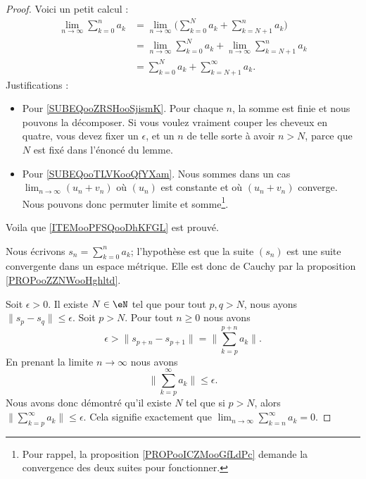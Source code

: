 \begin{proof}
    Voici un petit calcul :
    \begin{subequations}
        \begin{align}
            \lim_{n\to \infty} \sum_{k=0}^na_k&=\lim_{n\to \infty} \big( \sum_{k=0}^Na_k+\sum_{k=N+1}^{n}a_k \big)      \label{SUBEQooZRSHooSjismK}\\
            &=\lim_{n\to \infty} \sum_{k=0}^{N}a_k+\lim_{n\to \infty} \sum_{k=N+1}^{n}a_k       \label{SUBEQooTLVKooQfYXam}\\
            &=\sum_{k=0}^Na_k+\sum_{k=N+1}^{\infty}a_k.
        \end{align}
    \end{subequations}
    Justifications :
    \begin{itemize}
        \item Pour \eqref{SUBEQooZRSHooSjismK}. Pour chaque \( n\), la somme est finie et nous pouvons la décomposer. Si vous voulez vraiment couper les cheveux en quatre, vous devez fixer un \( \epsilon\), et un \( n\) de telle sorte à avoir \( n>N\), parce que \( N\) est fixé dans l'énoncé du lemme.
        \item Pour \eqref{SUBEQooTLVKooQfYXam}. Nous sommes dans un cas \( \lim_{n\to \infty}(u_n+v_n) \) où \( (u_n)\) est constante et où \( (u_n+v_n)\) converge. Nous pouvons donc permuter limite et somme\footnote{Pour rappel, la proposition \ref{PROPooICZMooGfLdPc} demande la convergence des deux suites pour fonctionner.}.
    \end{itemize}
    Voila que \ref{ITEMooPFSQooDhKFGL} est prouvé.

    Nous écrivons \( s_n=\sum_{k=0}^na_k\); l'hypothèse est que la suite \( (s_n)\) est une suite convergente dans un espace métrique. Elle est donc de Cauchy par la proposition \ref{PROPooZZNWooHghltd}.

    Soit \( \epsilon>0\). Il existe \( N\in \eN\) tel que pour tout \( p,q>N\), nous ayons \( \| s_p-s_q \|\leq \epsilon\). Soit \( p>N\). Pour tout \( n\geq 0\) nous avons
    \begin{equation}
        \epsilon>\| s_{p+n}-s_{p+1} \|=\| \sum_{k=p}^{p+n}a_k \|.
    \end{equation}
    En prenant la limite \( n\to \infty\) nous avons
    \begin{equation}
        \| \sum_{k=p}^{\infty}a_k \|\leq \epsilon.
    \end{equation}
    Nous avons donc démontré qu'il existe \( N\) tel que si \( p>N\), alors \( \| \sum_{k=p}^{\infty}a_k \|\leq \epsilon\). Cela signifie exactement que \( \lim_{n\to \infty} \sum_{k=n}^{\infty}a_k=0\).
\end{proof}

